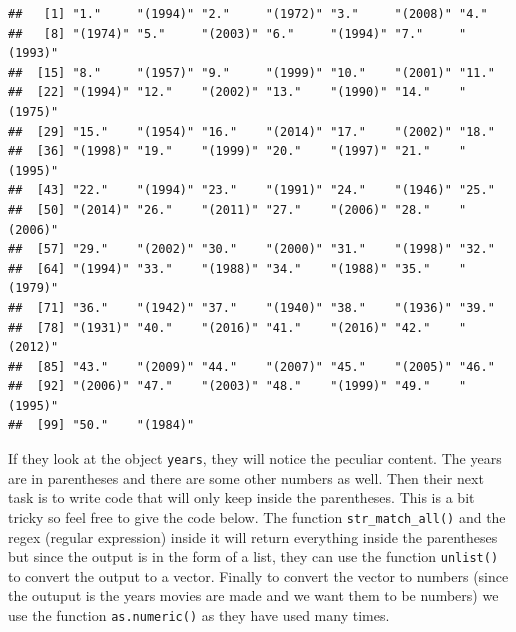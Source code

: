 \documentclass[]{book}
\newenvironment{Shaded}{\begin{snugshade}}{\end{snugshade}}
\newcommand{\CharTok}[1]{\textcolor[rgb]{0.31,0.60,0.02}{#1}}
\newcommand{\KeywordTok}[1]{\textcolor[rgb]{0.13,0.29,0.53}{\textbf{#1}}}
\newcommand{\NormalTok}[1]{#1}
\newcommand{\OperatorTok}[1]{\textcolor[rgb]{0.81,0.36,0.00}{\textbf{#1}}}
\newcommand{\StringTok}[1]{\textcolor[rgb]{0.31,0.60,0.02}{#1}}
\begin{document}
\begin{verbatim}
##   [1] "1."     "(1994)" "2."     "(1972)" "3."     "(2008)" "4."    
##   [8] "(1974)" "5."     "(2003)" "6."     "(1994)" "7."     "(1993)"
##  [15] "8."     "(1957)" "9."     "(1999)" "10."    "(2001)" "11."   
##  [22] "(1994)" "12."    "(2002)" "13."    "(1990)" "14."    "(1975)"
##  [29] "15."    "(1954)" "16."    "(2014)" "17."    "(2002)" "18."   
##  [36] "(1998)" "19."    "(1999)" "20."    "(1997)" "21."    "(1995)"
##  [43] "22."    "(1994)" "23."    "(1991)" "24."    "(1946)" "25."   
##  [50] "(2014)" "26."    "(2011)" "27."    "(2006)" "28."    "(2006)"
##  [57] "29."    "(2002)" "30."    "(2000)" "31."    "(1998)" "32."   
##  [64] "(1994)" "33."    "(1988)" "34."    "(1988)" "35."    "(1979)"
##  [71] "36."    "(1942)" "37."    "(1940)" "38."    "(1936)" "39."   
##  [78] "(1931)" "40."    "(2016)" "41."    "(2016)" "42."    "(2012)"
##  [85] "43."    "(2009)" "44."    "(2007)" "45."    "(2005)" "46."   
##  [92] "(2006)" "47."    "(2003)" "48."    "(1999)" "49."    "(1995)"
##  [99] "50."    "(1984)"
\end{verbatim}

If they look at the object \texttt{years}, they will notice the peculiar content. The years are in parentheses and there are some other numbers as well. Then their next task is to write code that will only keep inside the parentheses. This is a bit tricky so feel free to give the code below. The function \texttt{str\_match\_all()} and the regex (regular expression) inside it will return everything inside the parentheses but since the output is in the form of a list, they can use the function \texttt{unlist()} to convert the output to a vector. Finally to convert the vector to numbers (since the outuput is the years movies are made and we want them to be numbers) we use the function \texttt{as.numeric()} as they have used many times.

\begin{Shaded}
\end{Shaded}
\end{document}
